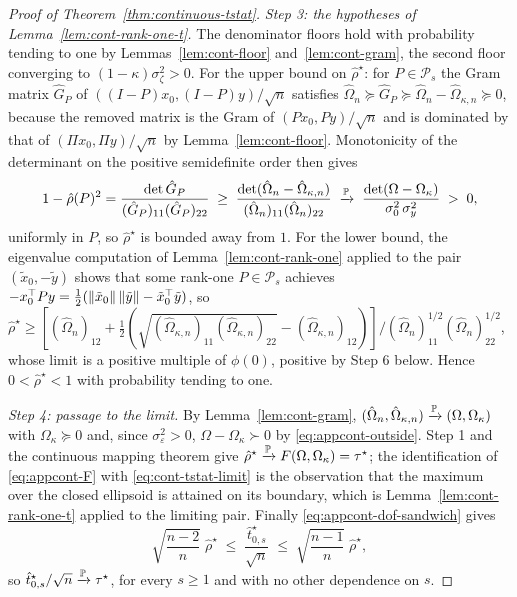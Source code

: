 \begin{proof}[Proof of Theorem~\ref{thm:continuous-tstat}]
{\emph{Step 3: the hypotheses of Lemma~\ref{lem:cont-rank-one-t}.} The
denominator floors hold with probability tending to one by
Lemmas~\ref{lem:cont-floor} and~\ref{lem:cont-gram}, the second floor
converging to $(1-\kappa) \sigma_\zeta^2 > 0$. For the upper bound on
$\hat\rho^\star$: for $P \in \mathcal P_s$ the Gram matrix
$\hat G_P$ of $((I-P)x_0, (I-P)y)/\sqrt n$ satisfies
$\hat\Omega_n \succeq \hat G_P \succeq \hat\Omega_n -
\hat\Omega_{\kappa,n} \succeq 0$, because the removed matrix is the Gram
of $(P x_0, P y)/\sqrt n$ and is dominated by that of
$(\Pi x_0, \Pi y)/\sqrt n$ by Lemma~\ref{lem:cont-floor}. Monotonicity of
the determinant on the positive semidefinite order then gives
\begin{equation}\label{eq:appcont-uniform-gap}
        1 - \hat\rho(P)^2
        =
        \frac{\det \hat G_P}{(\hat G_P)_{11} (\hat G_P)_{22}}
        \;\ge\;
        \frac{\det ( \hat\Omega_n - \hat\Omega_{\kappa,n} )}
        {(\hat\Omega_n)_{11} (\hat\Omega_n)_{22}}
        \;\xrightarrow{\mathbb{P}}\;
        \frac{\det(\Omega - \Omega_\kappa)}{\sigma_0^2\, \sigma_y^2}
        \;>\; 0,
\end{equation}
uniformly in $P$, so $\hat\rho^\star$ is bounded away from $1$. For the
lower bound, the eigenvalue computation of
Lemma~\ref{lem:cont-rank-one} applied to the pair
$(\tilde x_0, -\tilde y)$ shows that some rank-one $P \in \mathcal P_s$
achieves $-x_0^\top P y = \tfrac12 ( \left\lVert \tilde x_0 \right\rVert \left\lVert \tilde y \right\rVert
- \tilde x_0^\top \tilde y )$, so
$\hat\rho^\star \ge \left[ (\hat\Omega_n)_{12}
+ \tfrac12 ( \sqrt{ (\hat\Omega_{\kappa,n})_{11}
(\hat\Omega_{\kappa,n})_{22} } - (\hat\Omega_{\kappa,n})_{12} ) \right]
/ (\hat\Omega_n)_{11}^{1/2} (\hat\Omega_n)_{22}^{1/2}$, whose limit is a
positive multiple of $\phi(0)$, positive by Step 6 below. Hence
$0 < \hat\rho^\star < 1$ with probability tending to one.

\emph{Step 4: passage to the limit.} By Lemma~\ref{lem:cont-gram},
$(\hat\Omega_n, \hat\Omega_{\kappa,n}) \xrightarrow{\mathbb{P}} (\Omega, \Omega_\kappa)$
with $\Omega_\kappa \succeq 0$ and, since $\sigma_\varepsilon^2 > 0$,
$\Omega - \Omega_\kappa \succ 0$ by \eqref{eq:appcont-outside}. Step 1
and the continuous mapping theorem give
$\hat\rho^\star \xrightarrow{\mathbb{P}} F(\Omega, \Omega_\kappa) = \tau^\star$; the
identification of \eqref{eq:appcont-F} with \eqref{eq:cont-tstat-limit}
is the observation that the maximum over the closed ellipsoid is
attained on its boundary, which is Lemma~\ref{lem:cont-rank-one-t}
applied to the limiting pair. Finally
\eqref{eq:appcont-dof-sandwich} gives
\begin{equation*}
        \sqrt{\frac{n-2}{n}}\; \hat\rho^\star
        \;\le\;
        \frac{\hat t_{0,s}^\star}{\sqrt n}
        \;\le\;
        \sqrt{\frac{n-1}{n}}\; \hat\rho^\star,
\end{equation*}
so $\hat t_{0,s}^\star / \sqrt n \xrightarrow{\mathbb{P}} \tau^\star$, for every $s \ge 1$
and with no other dependence on $s$.

}
\end{proof}
